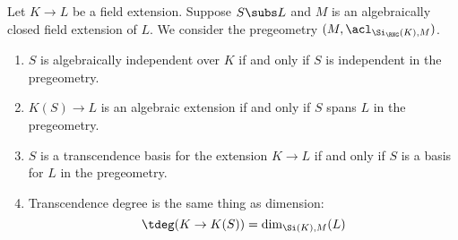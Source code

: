 \begin{prop}
    Let $K \to L$ be a field extension.
    Suppose $S \subs L$ and 
    $M$ is an algebraically closed field extension of $L$.
    We consider the pregeometry $(M,\acl_{\Si_\RNG(K),M})$.
    \begin{enumerate}
        \item $S$ is algebraically independent over $K$ if and only if 
            $S$ is independent in the pregeometry.
        \item $K(S) \to L$ is an algebraic extension if and only if $S$ 
            spans $L$ in the pregeometry.
        \item $S$ is a transcendence basis for the extension $K \to L$ 
            if and only if 
            $S$ is a basis for $L$ in the pregeometry.
        \item Transcendence degree is the same thing as dimension:
            \[\tdeg(K \to K(S)) = \dim_{\Si(K),M}(L)\]
    \end{enumerate}
\end{prop}
